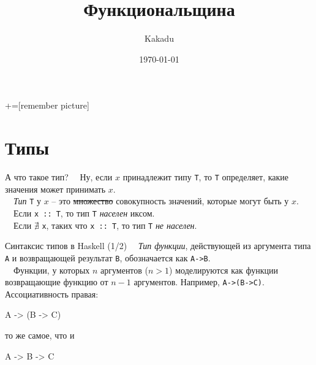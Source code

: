 \documentclass{beamer}
\title[Part of thesis title]{Функциональщина}
\author{Kakadu}
\institute{St Petersburg University}
\date{\today}
\newcommand{\inline}[1]{\lstinline{haskell}{#1}}
\def\hsinline{\lstinline[style={hsstyle1}]}
\def\inline{\hsinline}
\begin{document}

+=[remember picture]

\everymath{\displaystyle}


\section{Типы}

\begin{frame}[fragile]{А что такое тип?}
~\ Ну, если $x$ принадлежит типу \inline=T=, то \inline=T= определяет, какие значения может принимать $x$.
\\ \vspace{0.5cm} %
~\ \emph{Тип} \inline=T= у $x$ -- это \sout{множество} совокупность значений, которые могут быть у $x$.
\vspace{0.5cm} \\ %
~\  Если \inline=x :: T=, то тип \inline=T= \emph{населен} иксом.
\\ \vspace{0.5cm} %
~\ Если $\nexists$ \inline=x=, таких что \inline=x :: T=, то тип \inline=T= \emph{не населен}.
\end{frame}

\begin{frame}[fragile]{Синтаксис типов в Haskell (1/2)}
~\ \emph{Тип функции}, действующей из аргумента типа \hsinline{A} и возвращающей результат \hsinline{B}, обозначается как \hsinline{A->B}.
\\ \pause
~\ Функции, у которых $n$ аргументов ($n>1$) моделируются как функции возвращающие функцию от $n-1$ аргументов. Например, \hsinline{A->(B->C)}. \\
\pause 
\vspace{1cm}
Ассоциативность правая:
\begin{hslisting}
A -> (B -> C) 
\end{hslisting}
то же самое, что и
\begin{hslisting}
A -> B -> C
\end{hslisting}
\end{frame}
\end{document}
